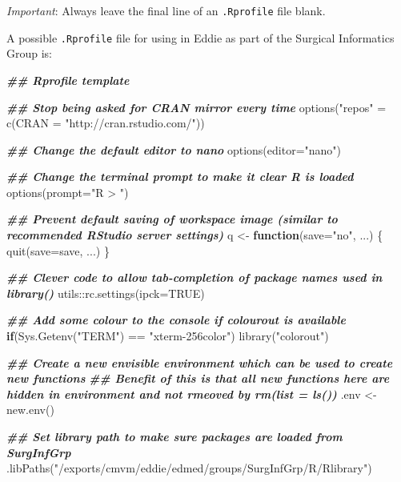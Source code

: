 \documentclass[
]{book}
\newenvironment{Shaded}{\begin{snugshade}}{\end{snugshade}}
\newcommand{\AttributeTok}[1]{\textcolor[rgb]{0.77,0.63,0.00}{#1}}
\newcommand{\ConstantTok}[1]{\textcolor[rgb]{0.00,0.00,0.00}{#1}}
\newcommand{\ControlFlowTok}[1]{\textcolor[rgb]{0.13,0.29,0.53}{\textbf{#1}}}
\newcommand{\DocumentationTok}[1]{\textcolor[rgb]{0.56,0.35,0.01}{\textbf{\textit{#1}}}}
\newcommand{\FunctionTok}[1]{\textcolor[rgb]{0.00,0.00,0.00}{#1}}
\newcommand{\NormalTok}[1]{#1}
\newcommand{\OtherTok}[1]{\textcolor[rgb]{0.56,0.35,0.01}{#1}}
\newcommand{\SpecialCharTok}[1]{\textcolor[rgb]{0.00,0.00,0.00}{#1}}
\newcommand{\StringTok}[1]{\textcolor[rgb]{0.31,0.60,0.02}{#1}}
\begin{document}
\emph{Important}: Always leave the final line of an \texttt{.Rprofile} file blank.

A possible \texttt{.Rprofile} file for using in Eddie as part of the Surgical Informatics Group is:

\begin{Shaded}
\begin{Highlighting}[]
\DocumentationTok{\#\# Rprofile template}


\DocumentationTok{\#\# Stop being asked for CRAN mirror every time}
\FunctionTok{options}\NormalTok{(}\StringTok{"repos"} \OtherTok{=} \FunctionTok{c}\NormalTok{(}\AttributeTok{CRAN =} \StringTok{"http://cran.rstudio.com/"}\NormalTok{))}


\DocumentationTok{\#\# Change the default editor to nano}
\FunctionTok{options}\NormalTok{(}\AttributeTok{editor=}\StringTok{"nano"}\NormalTok{)}

\DocumentationTok{\#\# Change the terminal prompt to make it clear R is loaded}
\FunctionTok{options}\NormalTok{(}\AttributeTok{prompt=}\StringTok{"R \textgreater{} "}\NormalTok{)}

\DocumentationTok{\#\# Prevent default saving of workspace image (similar to recommended RStudio server settings)}
\NormalTok{q }\OtherTok{\textless{}{-}} \ControlFlowTok{function}\NormalTok{(}\AttributeTok{save=}\StringTok{"no"}\NormalTok{, ...) \{}
        \FunctionTok{quit}\NormalTok{(}\AttributeTok{save=}\NormalTok{save, ...)}
\NormalTok{\}}


\DocumentationTok{\#\# Clever code to allow tab{-}completion of package names used in library()}
\NormalTok{utils}\SpecialCharTok{::}\FunctionTok{rc.settings}\NormalTok{(}\AttributeTok{ipck=}\ConstantTok{TRUE}\NormalTok{)}


\DocumentationTok{\#\# Add some colour to the console if colourout is available}
\ControlFlowTok{if}\NormalTok{(}\FunctionTok{Sys.Getenv}\NormalTok{(}\StringTok{"TERM"}\NormalTok{) }\SpecialCharTok{==} \StringTok{"xterm{-}256color"}\NormalTok{)}
        \FunctionTok{library}\NormalTok{(}\StringTok{"colorout"}\NormalTok{)}

\DocumentationTok{\#\# Create a new envisible environment which can be used to create new functions}
\DocumentationTok{\#\# Benefit of this is that all new functions here are hidden in environment and not rmeoved by rm(list = ls())}
\NormalTok{.env }\OtherTok{\textless{}{-}} \FunctionTok{new.env}\NormalTok{()}


\DocumentationTok{\#\# Set library path to make sure packages are loaded from SurgInfGrp}
\FunctionTok{.libPaths}\NormalTok{(}\StringTok{"/exports/cmvm/eddie/edmed/groups/SurgInfGrp/R/Rlibrary"}\NormalTok{)}



\end{Highlighting}
\end{Shaded}
\end{document}
